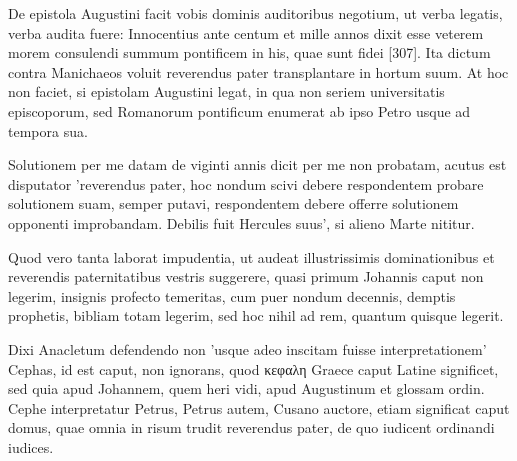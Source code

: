 De epistola Augustini facit vobis dominis auditoribus negotium, ut verba legatis, verba audita fuere: Innocentius ante centum et mille annos dixit esse veterem morem consulendi summum pontificem in his, quae sunt fidei [307]. Ita dictum contra Manichaeos voluit reverendus pater transplantare in hortum suum. At hoc non faciet, si epistolam Augustini legat, in qua non seriem universitatis episcoporum, sed Romanorum pontificum enumerat ab ipso Petro usque ad tempora sua.

Solutionem per me datam de viginti annis dicit per me non probatam, acutus est disputator 'reverendus pater, hoc nondum scivi debere respondentem probare solutionem suam, semper putavi, respondentem debere offerre solutionem opponenti improbandam. Debilis fuit Hercules suus', si alieno Marte nititur.

Quod vero tanta laborat impudentia, ut audeat illustrissimis dominationibus et reverendis paternitatibus vestris suggerere, quasi primum Johannis caput non legerim, insignis profecto temeritas, cum puer nondum decennis, demptis prophetis, bibliam totam legerim, sed hoc nihil ad rem, quantum quisque legerit.

Dixi Anacletum defendendo non 'usque adeo inscitam fuisse interpretationem' Cephas, id est caput, non ignorans, quod κεφαλη Graece caput Latine significet, sed quia apud Johannem, quem heri vidi, apud Augustinum et glossam ordin. Cephe interpretatur Petrus, Petrus autem, Cusano auctore, etiam significat caput domus, quae omnia in risum trudit reverendus pater, de quo iudicent ordinandi iudices.

